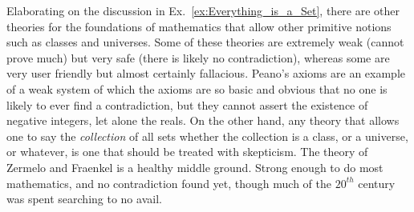         Elaborating on the discussion in Ex.~\ref{ex:Everything_is_a_Set}, there
        are other theories for the foundations of mathematics that allow other
        primitive notions such as classes and universes. Some of these theories
        are extremely weak (cannot prove much) but very safe (there is likely no
        contradiction), whereas some are very user friendly but almost certainly
        fallacious. Peano's axioms are an example of a weak system of which the
        axioms are so basic and obvious that no one is likely to ever find a
        contradiction, but they cannot assert the existence of negative
        integers, let alone the reals. On the other hand, any theory that
        allows one to say the \textit{collection} of all sets whether the
        collection is a class, or a universe, or whatever, is one that should be
        treated with skepticism. The theory of Zermelo and Fraenkel is a healthy
        middle ground. Strong enough to do most mathematics, and no
        contradiction found yet, though much of the $20^{th}$ century was spent
        searching to no avail.
